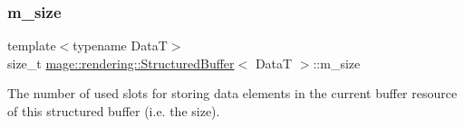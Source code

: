 \subsubsection{\texorpdfstring{m\+\_\+size}{m\_size}}
{\footnotesize\ttfamily template$<$typename DataT$>$ \\
size\+\_\+t \mbox{\hyperlink{classmage_1_1rendering_1_1_structured_buffer}{mage\+::rendering\+::\+Structured\+Buffer}}$<$ DataT $>$\+::m\+\_\+size\hspace{0.3cm}{\ttfamily [private]}}

The number of used slots for storing data elements in the current buffer resource of this structured buffer (i.\+e. the size). 